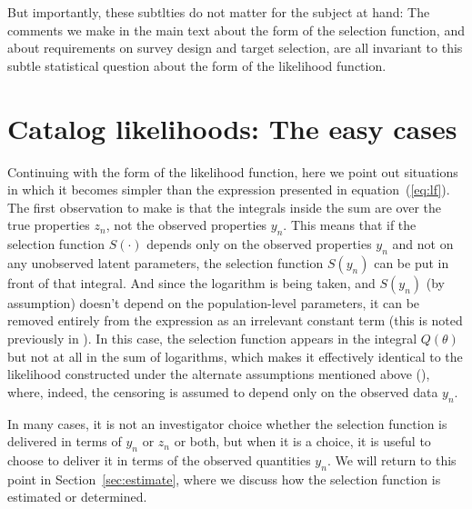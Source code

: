 \documentclass[modern]{aastex62}
\newcommand{\sectionname}{Section}
\begin{document}
But importantly, these subtlties do not matter for the subject at hand:
The comments we make in the main text about the form of the
selection function, and about requirements on survey design and target
selection, are all invariant to this subtle statistical question about
the form of the likelihood function.

\section{Catalog likelihoods: The easy cases}\label{app:easy}

Continuing with the form of the likelihood function, here we point out
situations in which it becomes simpler than the expression presented
in equation~(\ref{eq:lf}).
The first observation to make is that the integrals inside the sum are
over the true properties $z_n$, not the observed properties $y_n$.
This means that if the selection function $S(\cdot)$ depends only on
the observed properties $y_n$ and not on any unobserved latent parameters,
the selection function $S(y_n)$ can be put in front of that integral.
And since the logarithm is being taken, and $S(y_n)$ (by assumption)
doesn't depend on the population-level parameters, it can be removed
entirely from the expression as an irrelevant constant term (this is
noted previously in \citealt{bovy}).
In this case, the selection function appears in the integral
$Q(\theta)$ but not at all in the sum of logarithms, which
makes it effectively identical to the likelihood
constructed under the alternate assumptions mentioned above
(\citealt{loredo, mfg}), where, indeed, the censoring is assumed to
depend only on the observed data $y_n$.

In many cases, it is not an investigator choice whether the selection
function is delivered in terms of $y_n$ or $z_n$ or both, but when it
is a choice, it is useful to choose to deliver it in terms of the
observed quantities $y_n$.
We will return to this point in \sectionname~\ref{sec:estimate}, where
we discuss how the selection function is estimated or determined.
\end{document}
